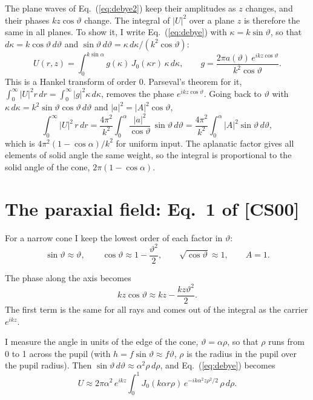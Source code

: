 \documentclass[11pt]{article}
\begin{document}
 The plane waves of Eq.~(\ref{eq:debye2}) keep their amplitudes as $z$
changes, and their phases $kz\cos\vartheta$ change. The integral of $|U|^2$ over a plane $z$ is therefore the same in
all planes. To show it, I write Eq.~(\ref{eq:debye}) with $\kappa = k\sin\vartheta$, so that
$d\kappa = k\cos\vartheta\,d\vartheta$ and $\sin\vartheta\,d\vartheta = \kappa\,d\kappa/(k^2\cos\vartheta)$:
\begin{equation}U(r,z) = \int_0^{k\sin\alpha} g(\kappa)\,J_0(\kappa r)\,\kappa\,d\kappa,\qquad
g = \frac{2\pi a(\vartheta)\,e^{ikz\cos\vartheta}}{k^2\cos\vartheta} .\end{equation}
This is a Hankel transform of order 0. Parseval's theorem for it, $\int_0^\infty|U|^2r\,dr = \int_0^\infty|g|^2\kappa\,d\kappa$,
removes the phase $e^{ikz\cos\vartheta}$. Going back to $\vartheta$ with $\kappa\,d\kappa = k^2\sin\vartheta\cos\vartheta\,d\vartheta$
and $|a|^2 = |A|^2\cos\vartheta$,
\begin{equation}\int_0^\infty|U|^2\,r\,dr = \frac{4\pi^2}{k^2}\int_0^\alpha\frac{|a|^2}{\cos\vartheta}\,\sin\vartheta\,d\vartheta
= \frac{4\pi^2}{k^2}\int_0^\alpha|A|^2\sin\vartheta\,d\vartheta ,\label{eq:plane}\end{equation}
which is $4\pi^2(1 - \cos\alpha)/k^2$ for uniform input. The aplanatic factor gives all elements of solid angle
the same weight, so the integral is proportional to the solid angle of the cone, $2\pi(1 - \cos\alpha)$.

\section{The paraxial field: Eq.~1 of [CS00]}
 For a narrow cone I keep the lowest order of each factor in $\vartheta$:
\begin{equation}\sin\vartheta \approx \vartheta,\qquad \cos\vartheta \approx 1 - \frac{\vartheta^2}{2},\qquad
\sqrt{\cos\vartheta} \approx 1,\qquad A = 1 .\end{equation}

 The phase along the axis becomes
\begin{equation}kz\cos\vartheta \approx kz - \frac{kz\vartheta^2}{2} .\end{equation}
The first term is the same for all rays and comes out of the integral as the carrier $e^{ikz}$.

 I measure the angle in units of the edge of the cone, $\vartheta = \alpha\rho$, so that $\rho$ runs from 0
to 1 across the pupil (with $h = f\sin\vartheta \approx f\vartheta$, $\rho$ is the radius in the pupil over the pupil
radius). Then $\sin\vartheta\,d\vartheta \approx \alpha^2\rho\,d\rho$, and Eq.~(\ref{eq:debye}) becomes
\begin{equation}U \approx 2\pi\alpha^2\,e^{ikz}\int_0^1 J_0(k\alpha r\rho)\,
e^{-ik\alpha^2z\rho^2/2}\,\rho\,d\rho .\end{equation}
\end{document}
